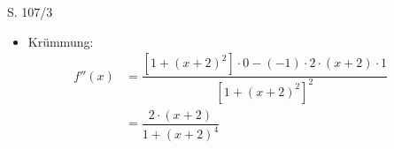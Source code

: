 \begin{Exercise}{S. 107/3}{}
\begin{enumerate}
\begin{enumerate}[label=\alph*),leftmargin=*]
{\begin{itemize}[leftmargin=*]
{                    \begin{minipage}[t]{0.4\linewidth}
                        \begin{align*}
                            n(x) &= 0 \\[2.0ex]
                            1 + \left(x+2\right)^{2} &= 0 &&| \quad -1\\[1.5ex]
                            \left(x+2\right)^{2} &= -1 &&| \quad \pm \sqrt[2]{\phantom{x}}\\[1.5ex]
                            & \textcolor{myr}{\text{n. d. in } \mathbb{R}}\\[-1.5ex]
                        \end{align*}
                    \end{minipage}
                    \hfill
                    \begin{minipage}[t]{0.55\linewidth}
                    \end{minipage}
                    $\Rightarrow \qquad G_{f}$ ist smf in $\left] \ -\infty; -2 \ \right[$ \quad sowie \quad $\left] \ -2; \infty \ \right[$\\[-2.0ex]
                    }
                \item Krümmung: \\[-2.0ex]{
                    \begin{align*}
                        f''(x) &= \dfrac{\left[1 + \left(x+2\right)^{2}\right] \cdot 0 - \left(-1\right) \cdot 2 \cdot \left(x+2\right) \cdot 1}{\left[1 + \left(x+2\right)^{2}\right]^{2}} &&\\[1.5ex]
                        &= \dfrac{2 \cdot \left(x + 2\right)}{1 + \left(x+2\right)^{4}} &&\\[-1.5ex]
                    \end{align*}
}
\end{itemize}}
\end{enumerate}
\end{enumerate}
\end{Exercise}
